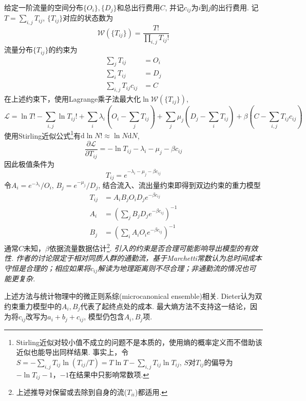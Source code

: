\par 给定一阶流量的空间分布$\{O_i\},\{D_j\}$和总出行费用$C$, 并记$c_{ij}$为$i$到$j$的出行费用. 记$T=\sum_{i,j}T_{ij}$, $\{T_{ij}\}$对应的状态数为
\begin{equation}
    \mathcal{W}(\{T_{ij}\})=\frac{T!}{\prod_{i,j}T_{ij}!}
\end{equation} 
流量分布$\{T_{ij}\}$的约束为
\begin{align}
    \sum_j T_{ij}&=O_i\\
    \sum_i T_{ij}&=D_j\\
    \sum_{i,j} T_{ij}c_{ij}&=C
\end{align}
在上述约束下，使用Lagrange乘子法最大化$\ln \mathcal{W}(\{T_{ij}\})$,
\begin{equation}
    \mathcal{L}=\ln T!-\sum_{i,j}\ln T_{ij}!+\sum_i \lambda_i (O_i-\sum_j T_{ij})+\sum_j \mu_j (D_j-\sum_i T_{ij}) +\beta (C-\sum_{i,j}T_{ij}c_{ij})
\end{equation}
使用Stirling近似公式\footnote{Stirling近似对较小值不成立的问题不是本质的，使用熵的概率定义而不借助该近似也能导出同样结果. 事实上，令$S=-\sum_{i,j}T_{ij}\ln(T_{ij}/T)=T\ln T-\sum_{i,j}T_{ij}\ln T_{ij}$, $S$对$T_{ij}$的偏导为$-\ln T_{ij}-1$，$-1$在结果中只影响常数项.}有$\mathrm{d}\ln N!\approx \ln N \mathrm{d}N$, 
\begin{equation}
    \frac{\partial \mathcal{L}}{\partial T_{ij}}=-\ln T_{ij}-\lambda_i-\mu_j -\beta c_{ij}
\end{equation}
因此极值条件为
\begin{equation}
    T_{ij}=e^{-\lambda_i-\mu_j-\beta c_{ij}}
\end{equation}
令$A_i=e^{-\lambda_i}/O_i$, $B_j=e^{-\mu_j}/D_j$, 结合流入、流出量约束即得到双边约束的重力模型
\begin{align}
    T_{ij}&=A_iB_jO_iD_j e^{-\beta c_{ij}}\\
    A_i &= \left(\sum_j B_jD_j e^{-\beta c_{ij}}\right)^{-1}\\
    B_j &= \left(\sum_i A_iO_ie^{-\beta c_{ij}}\right)^{-1}
\end{align}
通常$C$未知，$\beta$依据流量数据估计\footnote{上述推导对保留或去除到自身的流($T_{ii}$)都适用. }. \emph{引入的约束是否合理可能影响导出模型的有效性. 作者的讨论限定于相对同质人群的通勤流，基于Marchetti常数认为总时间成本守恒是合理的；相应如果将$c_{ij}$解读为地理距离则不尽合理；非通勤流的情况也可能更复杂. } 
\par 上述方法与统计物理中的微正则系综(microcanonical ensemble)相关. Dieter认为双约束重力模型中的$A_i, B_j$代表了起终点处的成本. 最大熵方法不支持这一结论，因为将$c_{ij}$改写为$a_i+b_j+c_{ij}$, 模型仍包含$A_i,B_j$项. 
